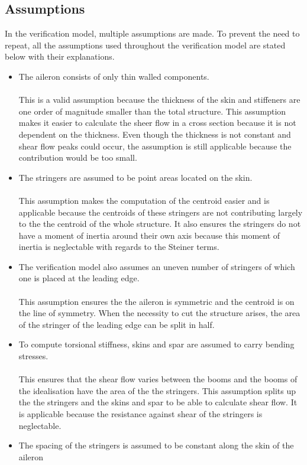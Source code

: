 \subsection{Assumptions}
In the verification model, multiple assumptions are made. To prevent the need to repeat, all the assumptions used throughout the verification model are stated below with their explanations.\\
\begin{itemize}
    \item The aileron consists of only thin walled components.\\\\
    This is a valid assumption because the thickness of the skin and stiffeners are one order of magnitude smaller than the total structure. This assumption makes it easier to calculate the sheer flow in a cross section because it is not dependent on the thickness. Even though the thickness is not constant and shear flow peaks could occur, the assumption is still applicable because the contribution would be too small.\\
    \item The stringers are assumed to be point areas located on the skin.\\ \\
    This assumption makes the computation of the centroid easier and is applicable because the centroids of these stringers are not contributing largely to the the centroid of the whole structure. It also ensures the stringers do not have a moment of inertia around their own axis because this moment of inertia is neglectable with regards to the Steiner terms.\\
    \item The verification model also assumes an uneven number of stringers of which one is placed at the leading edge.\\\\
    This assumption ensures the the aileron is symmetric and the centroid is on the line of symmetry. When the necessity to cut the structure arises, the area of the stringer of the leading edge can be split in half.\\
    \item To compute torsional stiffness, skins and spar are assumed to carry bending stresses.\\ \\ This ensures that the shear flow varies between the booms and the booms of the idealisation have the area of the the stringers. This assumption splits up the the stringers and the skins and spar to be able to calculate shear flow. It is applicable because the resistance against shear of the stringers is neglectable. \\
    \item The spacing of the stringers is assumed to be constant along the skin of the aileron
    
\end{itemize}
